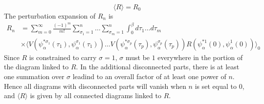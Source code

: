 \documentclass[12pt]{article}
\begin{document}
\begin{equation*}
    \langle R\rangle=R_0
\end{equation*}  
The perturbation expansion of $R_n$ is 
\begin{equation*}
    \begin{split}
        R_n&=\sum_{m=0}^\infty\frac{(-1)^m}{m!}\sum_{\sigma_1=1}^n\dots
        \sum_{\sigma_m=1}^n\int_0^\beta d\tau_1\dots d\tau_m\\
        &\times\langle V(\psi^{*\sigma_1}_\alpha(\tau_1),\psi^{\sigma_1}_\alpha(\tau_1))
        \dots V(\psi^{*\sigma_p}_\alpha(\tau_p),\psi^{\sigma_p}_\alpha(\tau_p))
        R(\psi^{*1}_\alpha(0),\psi^1_\alpha(0))\rangle_0
    \end{split}
\end{equation*}
Since $R$ is constrained to carry $\sigma=1$, $\sigma$ must be $1$ everywhere 
in the portion of the diagram linked to $R$. In the additional disconnected 
parts, there is at least one summation over $\sigma$ leadind to an overall 
factor of at least one power of $n$. Hence all diagrams with disconnected parts 
will vanish when $n$ is set equal to $0$, and $\langle R\rangle$ is given by all 
connected diagrams linked to $R$.
\end{document}
